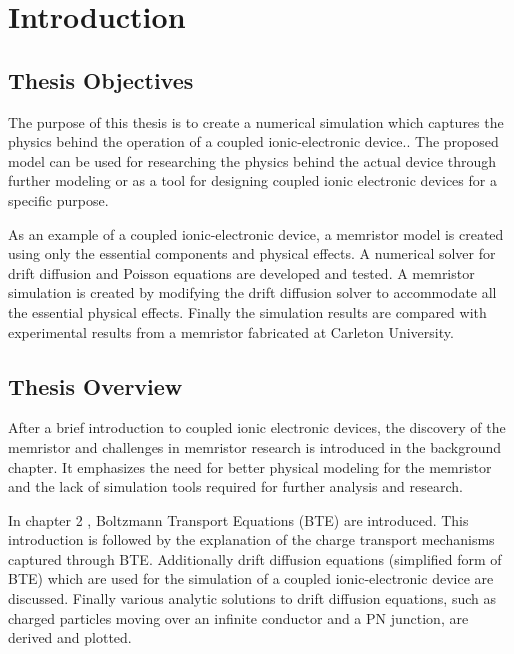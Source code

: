 
\chapter{Introduction} %


\label{Chapter1} %


\section{Thesis Objectives}
\begin{doublespace}
The purpose of this thesis is to create a numerical simulation which captures the physics behind the operation of a coupled ionic-electronic device.. The proposed model can be used for researching the physics behind the actual device through further modeling or as a tool for designing coupled ionic electronic devices for a specific purpose. 

As an example of a coupled ionic-electronic device, a memristor model is created using only the essential components and physical effects. A numerical solver for drift diffusion and Poisson equations are developed and tested. A memristor simulation is created by modifying the drift diffusion solver to accommodate all the essential physical effects. Finally the simulation results are compared with experimental results from a memristor fabricated at Carleton University.

\section{Thesis Overview}

After a brief introduction to coupled ionic electronic devices, the discovery of the memristor and challenges in memristor research is introduced in the background chapter. It emphasizes the need for better physical modeling for the memristor and the lack of simulation tools required for further analysis and research.

In chapter 2 , Boltzmann Transport Equations (BTE) are introduced. This introduction is followed by the explanation of the charge transport mechanisms captured through BTE. Additionally drift diffusion equations (simplified form of BTE) which are used for the simulation of a coupled ionic-electronic device are discussed. Finally various analytic solutions to drift diffusion equations, such as charged particles moving over an infinite conductor and a PN junction, are derived and plotted. 


\end{doublespace}
